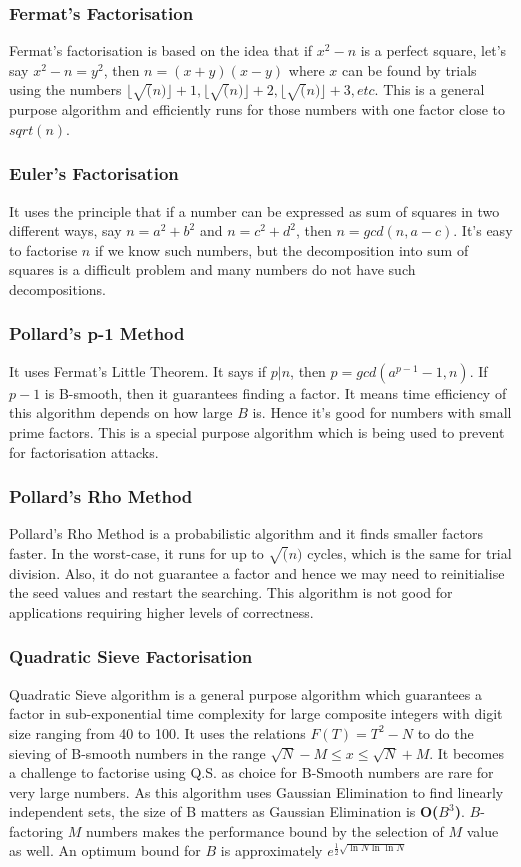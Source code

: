 \documentclass[11pt,a4paper,fleqn]{article}
\begin{document}
\begin{enumerate}[1.]
\begin{flushleft}
            \subsubsection*{Fermat's Factorisation} Fermat's factorisation is based on the idea that if $x^2 - n$ is a perfect square, let's say $x^2 - n = y^2$, then $n = (x + y)(x - y)$ where $x$ can be found by trials using the numbers  $\lfloor\sqrt(n)\rfloor + 1, \lfloor\sqrt(n)\rfloor + 2, \lfloor\sqrt(n)\rfloor + 3, etc$. This is a general purpose algorithm and efficiently runs for those numbers with one factor close to $sqrt(n)$.
            \subsubsection*{Euler's Factorisation} It uses the principle that if a number can be expressed as sum of squares in two different ways, say $n = a^2 + b^2$ and $n = c^2 + d^2$, then $n = gcd(n, a - c)$. It's easy to factorise $n$ if we know such numbers, but the decomposition into sum of squares is a difficult problem and many numbers do not have such decompositions.
            \subsubsection*{Pollard's p-1 Method} It uses Fermat's Little Theorem. It says if $p|n$, then $p = gcd(a^{p - 1} - 1, n)$.  If $p - 1$ is B-smooth, then it guarantees finding a factor. It means time efficiency of this algorithm depends on how large $B$ is. Hence it's good for numbers with small prime factors. This is a special purpose algorithm which is being used to prevent for factorisation attacks.
            \subsubsection*{Pollard's Rho Method} Pollard's Rho Method is a probabilistic algorithm and it finds smaller factors faster. In the worst-case, it runs for up to $\sqrt(n)$ cycles, which is the same for trial division. Also, it do not guarantee a factor and hence we may need to reinitialise the seed values and restart the searching. This algorithm is not good for applications requiring higher levels of correctness.
            \subsubsection*{Quadratic Sieve Factorisation} Quadratic Sieve algorithm is a general purpose algorithm which guarantees a factor in sub-exponential time complexity for large composite integers with digit size ranging from 40 to 100. It uses the relations $F(T) = T^2 - N$ to do the sieving of B-smooth numbers in the range $\sqrt{N} - M \le x \le \sqrt{N} + M$. It becomes a challenge to factorise using Q.S. as choice for B-Smooth numbers are rare for very large numbers. As this algorithm uses Gaussian Elimination to find linearly independent sets, the size of B matters as Gaussian Elimination is \textbf{O($B^3$)}. $B$-factoring $M$ numbers makes the performance bound by the selection of $M$ value as well. An optimum bound for $B$ is approximately \cite{number_theory_3} $e^{\frac{1}{2}\sqrt{\ln N \ln \ln N}}$

\end{flushleft}
\end{enumerate}
\end{document}
